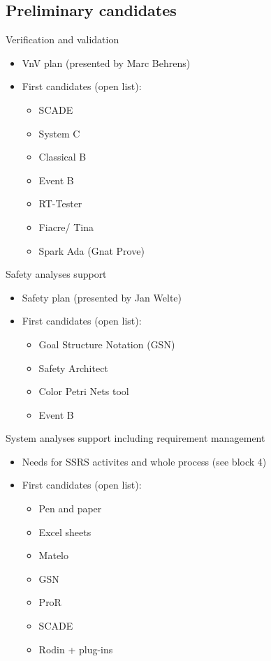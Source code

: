 \subsection{Preliminary candidates}


\begin{frame}{Verification and validation}

\begin{itemize}
\item VnV plan (presented by Marc Behrens)
\item First candidates (open list):
\begin{itemize}
\item SCADE
\item System C
\item Classical B
\item Event B
\item RT-Tester
\item Fiacre/ Tina
\item Spark Ada (Gnat Prove)
\end{itemize}
\end{itemize}

\end{frame}


\begin{frame}{Safety analyses support}


\begin{itemize}
\item Safety plan (presented by Jan Welte)
\item First candidates (open list):
\begin{itemize}
\item Goal Structure Notation (GSN)
\item Safety Architect
\item Color Petri Nets tool
\item Event B
\end{itemize}
\end{itemize}


\end{frame}


\begin{frame}{System analyses support}{ including requirement management}


\begin{itemize}
\item Needs for SSRS activites and whole process (see block 4)
\item First candidates (open list):
\begin{itemize}
\item Pen and paper
\item Excel sheets
\item Matelo
\item GSN
\item ProR
\item SCADE
\item Rodin + plug-ins
\end{itemize}
\end{itemize}


\end{frame}




